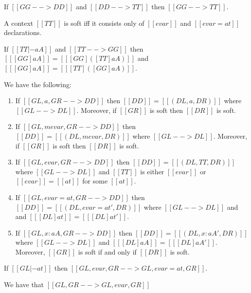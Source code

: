 \begin{lemma}[Transitivity]   \label{lemma:transitivity}
  If $[[GG --> DD]] $ and $[[DD --> TT]]$ then $[[ GG --> TT  ]]$.
\end{lemma}

\begin{definition}[Softness]
  A context $[[TT]]$ is soft iff it consists only of $[[evar]]$ and $[[evar = at]]$ declarations.
\end{definition}


\begin{lemma}  \label{lemma:subst_ext_invar}
  If $[[TT |- aA]]$ and $[[TT --> GG]]$ then $[[ [GG]aA ]] = [[ [GG] ([TT]aA)]]  $ and $ [[ [GG]aA ]] = [[ [TT] ([GG]aA)]]   $.
\end{lemma}


\begin{lemma} \label{lemma:extension_order}%
  We have the following:
  \begin{enumerate}
  \item If $[[ GL , a, GR --> DD]]$ then $[[DD]]  = [[(DL, a, DR)]]  $ where
    $[[GL --> DL]]$. Moreover, if $[[GR]]$ is soft then $[[DR]]$ is soft.
  \item If $[[ GL , mevar, GR --> DD]]$ then $[[DD]]  = [[(DL, mevar, DR)]]  $ where
    $[[GL --> DL]]$. Moreover, if $[[GR]]$ is soft then $[[DR]]$ is soft.
  \item If $[[GL, evar, GR --> DD]]$ then $[[DD]]  = [[(DL, TT, DR)]]  $ where $[[GL --> DL]]$ and $[[TT]]$ is either $[[evar]]$ or $[[evar]] = [[at]]$ for some $[[at]]$.
  \item If $[[GL, evar = at, GR --> DD]]$ then $[[DD]]  = [[(DL, evar = at', DR)]]  $ where $[[GL --> DL]]$ and and $[[ [DL]at  ]] = [[ [DL] at' ]]$.
  \item If $[[GL , x : aA , GR --> DD]]$ then $[[DD]]  = [[(DL, x : aA', DR)]]  $ where $[[GL --> DL]]$ and $[[ [DL]aA  ]] = [[ [DL] aA' ]]$. Moreover, $[[GR]]$ is soft if and only if $[[DR]]$ is soft.
  \end{enumerate}
\end{lemma}


\begin{lemma} \label{lemma:solution_ext}
  If $[[ GL |- at  ]]$ then $[[  GL, evar, GR --> GL, evar = at, GR ]]$.
\end{lemma}


\begin{lemma}   \label{lemma:unsolved_ext}
  We have that $ [[GL, GR --> GL, evar, GR]] $
\end{lemma}


